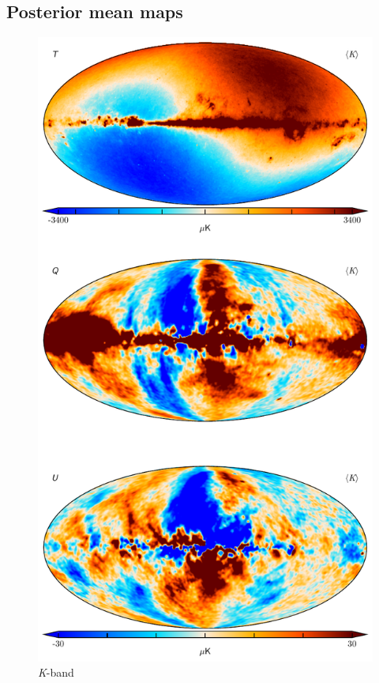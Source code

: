 \documentclass[twocolumn]{../../common/aa}
\newcommand{\K}[0]{\textit K}
\begin{document}
\subsection{Posterior mean maps}

\begin{figure}
	\centering
	\includegraphics[height=0.9\textheight]{figures/023-WMAP_K_map.pdf}
	\caption{\K-band}
\end{figure}
\end{document}
